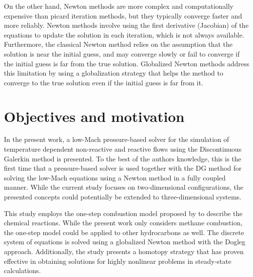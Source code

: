 On the other hand, Newton methods are more complex and computationally expensive than picard iteration methods, but they typically converge faster and more reliably. Newton methods involve using the first derivative (Jacobian) of the equations to update the solution in each iteration, which is not always available. Furthermore, the classical Newton method relies on the assumption that the solution is near the initial guess, and may converge slowly or fail to converge if the initial guess is far from the true solution. Globalized Newton methods address this limitation by using a globalization strategy that helps the method to converge to the true solution even if the initial guess is far from it.
 
\section{Objectives and motivation}


In the present work, a low-Mach pressure-based solver for the simulation of temperature dependent non-reactive and reactive flows using the Discontinuous Galerkin method is presented. To the best of the authors knowledge, this is the first time that a pressure-based solver is used together with the DG method for solving the low-Mach equations using a Newton method in a fully coupled manner. While the current study focuses on two-dimensional configurations, the presented concepts could potentially be extended to three-dimensional systems.

This study employs the one-step combustion model proposed by \textcite{fernandez-tarrazoSimpleOnestepChemistry2006} to describe the chemical reactions. While the present work only considers methane combustion, the one-step model could be applied to other hydrocarbons as well. The discrete system of equations is solved using a globalized Newton method with the Dogleg approach. Additionally, the study presents a homotopy strategy that has proven effective in obtaining solutions for highly nonlinear problems in steady-state calculations.

